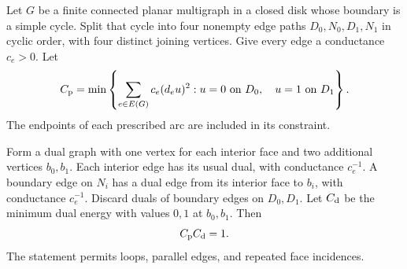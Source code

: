 \begin{lemma}\label{lem:mixed-duality}
Let \(G\) be a finite connected planar multigraph in a closed disk whose
boundary is a simple cycle.  Split that cycle into four nonempty edge paths
\(D_0,N_0,D_1,N_1\) in cyclic order, with four distinct joining vertices.
Give every edge a conductance \(c_e>0\).  Let
\[
 C_{\rm p}
 =\min\left\{\sum_{e\in E(G)}c_e(d_e u)^2:
             u=0\text{ on }D_0,\quad u=1\text{ on }D_1\right\}.
\]
The endpoints of each prescribed arc are included in its constraint.

Form a dual graph with one vertex for each interior face and two additional
vertices \(b_0,b_1\).  Each interior edge has its usual dual, with
conductance \(c_e^{-1}\).  A boundary edge on \(N_i\) has a dual edge
from its interior face to \(b_i\), with conductance \(c_e^{-1}\).
Discard duals of boundary edges on \(D_0,D_1\).  Let \(C_{\rm d}\) be
the minimum dual energy with values \(0,1\) at \(b_0,b_1\).  Then
\begin{equation}\label{eq:finite-duality}
                              C_{\rm p}C_{\rm d}=1.
\end{equation}
The statement permits loops, parallel edges, and repeated face incidences.
\end{lemma}

